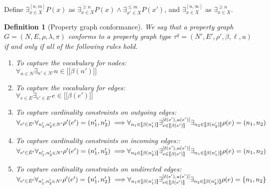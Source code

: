 \documentclass[a4paper]{article}
\newtheorem{definition}[theorem]{Definition}
\newcommand{\gtype}{\tau^g}
\newcommand{\lsem}{\ensuremath{[\![}}
\newcommand{\rsem}{\ensuremath{]\!]}}
\newcommand{\sem}[1]{\ensuremath{\lsem #1 \rsem}}
\begin{document}
Define $\exists^{[n, m]}_{x \in X} P(x)$ as $\exists^{\geq n}_{x \in X} P(x) \wedge \exists^{\leq m}_{x' \in X} P(x')$,
and $\exists^{[n, \infty]}_{x \in X}$ as $\exists^{\geq n}_{x \in X}$.

\begin{definition}[Property graph conformance]
  We say that a property graph $G = (N, E, \rho, \lambda, \pi)$ \emph{conforms} to a property graph type $\gtype = (N', E', \rho', \beta, \ell, u)$ if and only if all of the following rules hold.

  \begin{enumerate}
    \item To capture the vocabulary for nodes:\\
    $\forall_{n \in N} \exists_{n' \in N'} n \in \sem{\beta(n')}$

    \item To capture the vocabulary for edges:\\
    $\forall_{e \in E} \exists_{e' \in E'} e \in \sem{\beta(e')}$

    \item To capture cardinality constraints on outgoing edges:\\
    $\forall_{e' \in E'} \forall_{n'_1, n'_2 \in N'} \rho'(e') = (n'_1, n'_2) \implies
    \\\forall_{n_1 \in \sem{\beta(n'_1)}} \exists^{[\ell(e'), u(e')]}_{e \in \sem{\beta(e')}} \exists_{n_2 \in \sem{\beta(n'_2)}} \rho(e) = (n_1, n_2)$

    \item To capture cardinality constraints on incoming edges::\\
    $\forall_{e' \in E'} \forall_{n'_1, n'_2 \in N'} \rho'(e') = (n'_1, n'_2) \implies
    \\\forall_{n_2 \in \sem{\beta(n'_2)}} \exists^{[\ell(e'), u(e')]}_{e \in \sem{\beta(e')}} \exists_{n_1 \in \sem{\beta(n'_1)}} \rho(e) = (n_1, n_2)$
    
    \item To capture cardinality constraints on undirected edges:\\
    $\forall_{e' \in E'} \forall_{n'_1, n'_2 \in N'} \rho'(e') = \{n'_1, n'_2\} \implies
    \\\forall_{n_1 \in \sem{\beta(n'_1)}} \exists^{[\ell(e'), u(e')]}_{e \in \sem{\beta(e')}} \exists_{n_2 \in \sem{\beta(n'_2)}} \rho(e) = \{n_1, n_2\}$
  \end{enumerate}
\end{definition}

\end{document}
